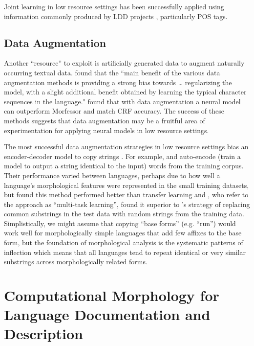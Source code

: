 \documentclass[12pt]{article}
\begin{document}
Joint learning in low resource settings has been successfully applied using information commonly produced by LDD projects \cite{palmer_semi-automated_2009,moeller_automatic_2018}, particularly POS tags.

\subsection{Data Augmentation}
\label{augment}

Another ``resource'' to exploit is artificially generated data to augment naturally occurring textual data.  found that the ``main benefit of the various data augmentation methods is providing a strong bias towards … regularizing the model, with a slight additional benefit obtained by learning the typical character sequences in the language."  found that with data augmentation a neural model can outperform Morfessor and match CRF accuracy. The success of these methods suggests that data augmentation may be a fruitful area of experimentation for applying neural models in low resource settings.

The most successful data augmentation strategies in low resource settings bias an encoder-decoder model to copy strings \cite{bergmanis_training_2017,kann_fortification_2018,makarov_align_2017,makarov_uzh_2018}. For example,  and  auto-encode (train a model to output a string identical to the input) words from the training corpus. Their performance varied between languages, perhaps due to how well a language’s morphological features were represented in the small training datasets, but  found this method performed better than transfer learning and , who refer to the approach as ``multi-task learning'', found it superior to 's strategy of replacing common substrings in the test data with random strings from the training data.  Simplistically, we might assume that copying ``base forms'' (e.g. ``run'') would work well for morphologically simple languages that add few affixes to the base form, but the foundation of morphological analysis is the systematic patterns of inflection which means that all languages tend to repeat identical or very similar substrings across morphologically related forms. 

\section{Computational Morphology for Language Documentation and Description}
\label{CLLDD}
\end{document}
